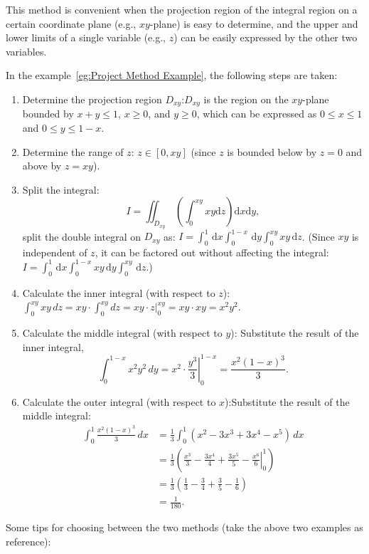 \documentclass[11pt]{../../TexTemplate/elegantbook}
\begin{document}
\begin{description}
This method is convenient when the projection region of the integral region on 
a certain coordinate plane (e.g., \(xy\)-plane) is easy to determine, 
and the upper and lower limits of a single variable (e.g., \(z\)) can 
be easily expressed by the other two variables.

In the example~\ref{eg:Project Method Example}, the following steps are taken:
\begin{enumerate}
    \item Determine the projection region \(D_{xy}\):\(D_{xy}\) is the region on the \(xy\)-plane 
        bounded by \(x + y \leqslant 1\), \(x \geq 0\), and \(y \geq 0\), 
        which can be expressed as \(0 \leqslant x \leqslant 1\) and \(0 \leqslant y \leqslant 1 - x\).
    \item Determine the range of \(z\): \(z \in [0, xy]\) (since \(z\) is bounded below by \(z = 0\) and above by \(z = xy\)).
    \item Split the integral: 
        \[
        I = \iint_{D_{xy}}\, \left( \int_{0}^{xy} xy \mathrm{d}z \right)  \mathrm{d}x \mathrm{d}y,
        \]
        split the double integral on \(D_{xy}\) as:
        \(I = \int_{0}^{1} \, \mathrm{d}x \int_{0}^{1 - x} \, \mathrm{d}y  \int_{0}^{xy} xy \, \mathrm{d}z\).
        (Since \(xy\) is independent of \(z\), it can be factored out without affecting the integral:
        \(I = \int_{0}^{1} \, \mathrm{d}x \int_{0}^{1 - x} xy \, \mathrm{d}y  \int_{0}^{xy} \, \mathrm{d}z\).)
    \item Calculate the inner integral (with respect to \(z\)):
        \(\int_{0}^{xy} xy \, dz = xy \cdot \int_{0}^{xy} dz 
        = xy \cdot \left. z \right|_{0}^{xy} = xy \cdot xy = x^2 y^2\).
    \item Calculate the middle integral (with respect to \(y\)):
        Substitute the result of the inner integral,
        \[
        \int_{0}^{1 - x} x^2 y^2 \, dy 
        = x^2 \cdot \left. \frac{y^3}{3} \right|_{0}^{1 - x} = \frac{x^2 (1 - x)^3}{3}.
        \]
    \item Calculate the outer integral (with respect to \(x\)):Substitute the result of the middle integral:
        \begin{align*}
            \int_{0}^{1} \frac{x^2 (1 - x)^3}{3} \, dx &= \frac{1}{3} \int_{0}^{1} (x^2 - 3x^3 + 3x^4 - x^5) \, dx \\
            &= \frac{1}{3} \left( \left. \frac{x^3}{3} - \frac{3x^4}{4} + \frac{3x^5}{5} - \frac{x^6}{6} \right|_{0}^{1} \right) \\
            &= \frac{1}{3} \left( \frac{1}{3} - \frac{3}{4} + \frac{3}{5} - \frac{1}{6} \right) \\
            &= \frac{1}{180}.
        \end{align*}
\end{enumerate}
\end{description}
Some tips for choosing between the two methods (take the above two examples as reference):
\end{document}

